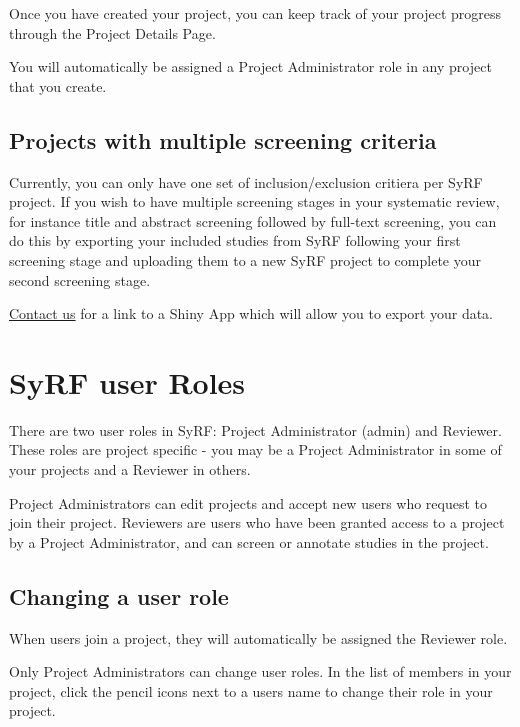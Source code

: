 \documentclass[
]{book}
\begin{document}
Once you have created your project, you can keep track of your project progress through the Project Details Page.

You will automatically be assigned a Project Administrator role in any project that you create.

\hypertarget{projects-with-multiple-screening-criteria}{%
\section{Projects with multiple screening criteria}\label{projects-with-multiple-screening-criteria}}

Currently, you can only have one set of inclusion/exclusion critiera per SyRF project. If you wish to have multiple screening stages in your systematic review, for instance title and abstract screening followed by full-text screening, you can do this by exporting your included studies from SyRF following your first screening stage and uploading them to a new SyRF project to complete your second screening stage.

\href{mailto:syrf.info@ed.ac.uk}{Contact us} for a link to a Shiny App which will allow you to export your data.

\hypertarget{roles}{%
\chapter{SyRF user Roles}\label{roles}}

There are two user roles in SyRF: Project Administrator (admin) and Reviewer. These roles are project specific - you may be a Project Administrator in some of your projects and a Reviewer in others.

Project Administrators can edit projects and accept new users who request to join their project. Reviewers are users who have been granted access to a project by a Project Administrator, and can screen or annotate studies in the project.

\hypertarget{changing-a-user-role}{%
\section{Changing a user role}\label{changing-a-user-role}}

When users join a project, they will automatically be assigned the Reviewer role.

Only Project Administrators can change user roles. In the list of members in your project, click the pencil icons next to a users name to change their role in your project.
\end{document}
